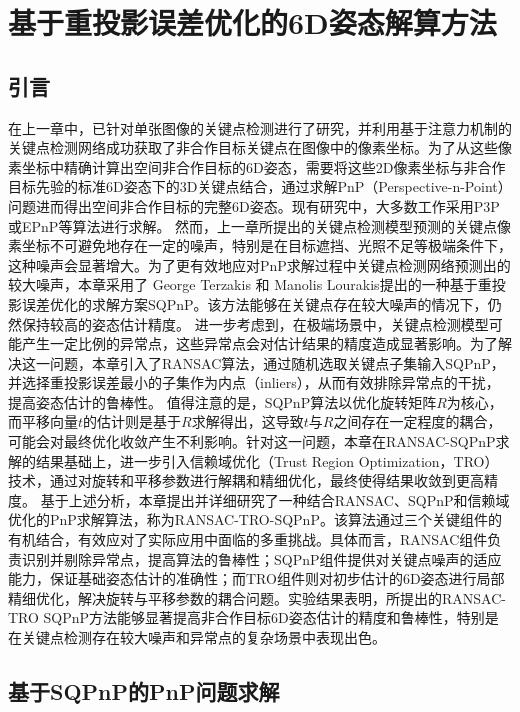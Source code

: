 \chapter{基于重投影误差优化的6D姿态解算方法}
\label{chap:RANSAC-TRO-SQPnP}

\section{引言}
\label{sec:RANSAC-TRO-SQPnP:intro}
在上一章中，已针对单张图像的关键点检测进行了研究，并利用基于注意力机制的关键点检测网络成功获取了非合作目标关键点在图像中的像素坐标。为了从这些像素坐标中精确计算出空间非合作目标的6D姿态，需要将这些2D像素坐标与非合作目标先验的标准6D姿态下的3D关键点结合，通过求解PnP（Perspective-n-Point）问题进而得出空间非合作目标的完整6D姿态。现有研究中，大多数工作采用P3P\cite{chen2019satellite,s22218541,Guo_2022}或EPnP\cite{li2022learning,huan2020pose,lotti2022investigating}等算法进行求解。
然而，上一章所提出的关键点检测模型预测的关键点像素坐标不可避免地存在一定的噪声，特别是在目标遮挡、光照不足等极端条件下，这种噪声会显著增大。为了更有效地应对PnP求解过程中关键点检测网络预测出的较大噪声，本章采用了 George Terzakis 和 Manolis Lourakis提出的一种基于重投影误差优化的求解方案SQPnP\cite{terzakis2020consistently}。该方法能够在关键点存在较大噪声的情况下，仍然保持较高的姿态估计精度。
进一步考虑到，在极端场景中，关键点检测模型可能产生一定比例的异常点，这些异常点会对估计结果的精度造成显著影响。为了解决这一问题，本章引入了RANSAC算法，通过随机选取关键点子集输入SQPnP，并选择重投影误差最小的子集作为内点（inliers），从而有效排除异常点的干扰，提高姿态估计的鲁棒性。
值得注意的是，SQPnP算法以优化旋转矩阵$R$为核心，而平移向量$t$的估计则是基于$R$求解得出，这导致$t$与$R$之间存在一定程度的耦合，可能会对最终优化收敛产生不利影响。针对这一问题，本章在RANSAC-SQPnP求解的结果基础上，进一步引入信赖域优化（Trust Region Optimization，TRO）技术，通过对旋转和平移参数进行解耦和精细优化，最终使得结果收敛到更高精度。
基于上述分析，本章提出并详细研究了一种结合RANSAC、SQPnP和信赖域优化的PnP求解算法，称为RANSAC-TRO-SQPnP。该算法通过三个关键组件的有机结合，有效应对了实际应用中面临的多重挑战。具体而言，RANSAC组件负责识别并剔除异常点，提高算法的鲁棒性；SQPnP组件提供对关键点噪声的适应能力，保证基础姿态估计的准确性；而TRO组件则对初步估计的6D姿态进行局部精细优化，解决旋转与平移参数的耦合问题。实验结果表明，所提出的RANSAC-TRO SQPnP方法能够显著提高非合作目标6D姿态估计的精度和鲁棒性，特别是在关键点检测存在较大噪声和异常点的复杂场景中表现出色。


\section{基于SQPnP的PnP问题求解}
\label{sec:RANSAC-TRO-SQPnP:SQPnP}
\vspace{1ex}

